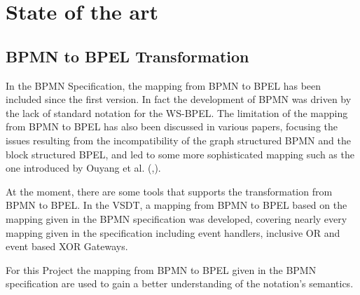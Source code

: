 \chapter{State of the art}
\label{chap:sota}
\section{BPMN to BPEL Transformation}
In the BPMN Specification, the mapping from BPMN to BPEL has been included since the first version. In fact the development of BPMN was driven by the lack of standard notation for the WS-BPEL\cite{weidlich2008}. The limitation of the mapping from BPMN to BPEL has also been discussed in various papers, focusing the issues resulting from the incompatibility of the graph structured BPMN and the block structured BPEL, and led to some more sophisticated mapping such as the one introduced by Ouyang et al. (\cite{Ouyang2006a},\cite{Ouyang2006b}).

At the moment, there are some tools that supports the transformation from BPMN to BPEL.
In the VSDT, a mapping from BPMN to BPEL based on the mapping given in the BPMN specification was developed, covering nearly every mapping given in the specification including event handlers, inclusive OR and event based XOR Gateways. 

For this Project the mapping from BPMN to BPEL given in the BPMN specification are used to gain a better understanding of the notation's semantics.


